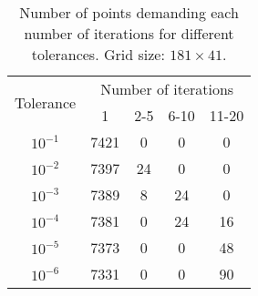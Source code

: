 	\begin{table}
	\centering
	\captionsetup{justification=centering}
	\begin{tabular}{c c c c c}
	\hline
	\multirow{2}{*}{Tolerance} & \multicolumn{4}{c}{Number of iterations}\\
	 & 1 & 2-5 & 6-10 & 11-20\\\hline
	$10^{-1}$ & 7421 & 0 & 0 & 0\\
	$10^{-2}$ & 7397 & 24 & 0 & 0\\
	$10^{-3}$ & 7389 & 8 & 24 & 0\\
	$10^{-4}$ & 7381 & 0 & 24 & 16\\
	$10^{-5}$ & 7373 & 0 & 0 & 48\\
	$10^{-6}$ & 7331 & 0 & 0 & 90\\
	\hline
	\end{tabular}
	\caption{Number of points demanding each number of iterations for different tolerances. Grid size: $181 \times 41$.}
	\label{tab:projpt_numit}
	\end{table}